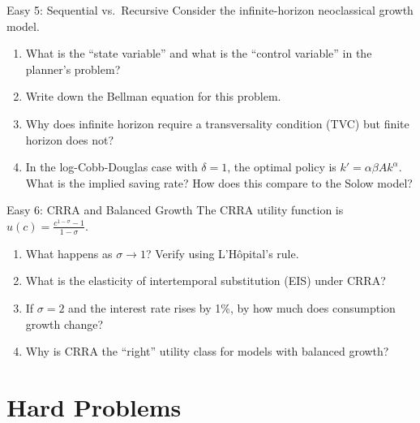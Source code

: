 \documentclass[aspectratio=169,10pt]{beamer}
\newcommand{\apxbutton}[1]{\hfill\hyperlink{#1}{\beamerbutton{Solution}}}
\begin{document}
\begin{frame}{Easy 5: Sequential vs.\ Recursive}
\hypertarget{q-e5}{}
Consider the infinite-horizon neoclassical growth model.

\begin{enumerate}
  \item What is the ``state variable'' and what is the ``control variable'' in the planner's problem?
  \item Write down the Bellman equation for this problem.
  \item Why does infinite horizon require a transversality condition (TVC) but finite horizon does not?
  \item In the log-Cobb-Douglas case with $\delta=1$, the optimal policy is $k'=\alpha\beta Ak^\alpha$. What is the implied saving rate? How does this compare to the Solow model?
\end{enumerate}
\apxbutton{s-e5}
\end{frame}

\begin{frame}{Easy 6: CRRA and Balanced Growth}
\hypertarget{q-e6}{}
The CRRA utility function is $u(c) = \frac{c^{1-\sigma}-1}{1-\sigma}$.

\begin{enumerate}
  \item What happens as $\sigma \to 1$? Verify using L'H\^{o}pital's rule.
  \item What is the elasticity of intertemporal substitution (EIS) under CRRA?
  \item If $\sigma = 2$ and the interest rate rises by 1\%, by how much does consumption growth change?
  \item Why is CRRA the ``right'' utility class for models with balanced growth?
\end{enumerate}
\apxbutton{s-e6}
\end{frame}


\section{Hard Problems}
\end{document}

